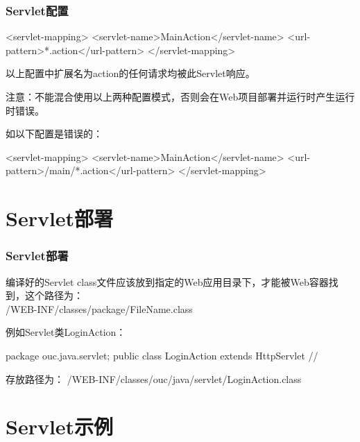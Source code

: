 \begin{frame}[fragile] %
\frametitle{Servlet配置}

\begin{xmlCode}
<servlet-mapping>
  <servlet-name>MainAction</servlet-name>
  <url-pattern>*.action</url-pattern>
</servlet-mapping>
\end{xmlCode}

以上配置中扩展名为action的任何请求均被此Servlet响应。

{\Red\kai 注意：不能混合使用以上两种配置模式，否则会在Web项目部署并运行时产生运行时错误。}

如以下配置是错误的：

\begin{xmlCode}
<servlet-mapping>
  <servlet-name>MainAction</servlet-name>
  <url-pattern>/main/*.action</url-pattern>
</servlet-mapping>
\end{xmlCode}
\end{frame}

\section{Servlet部署}

\begin{frame}[fragile] %
\frametitle{Servlet部署}

编译好的Servlet class文件应该放到指定的Web应用目录下，才能被Web容器找到，这个路径为：\\
{\Red /WEB-INF/classes/package/FileName.class}

例如Servlet类LoginAction：
\begin{javaCode}
package ouc.java.servlet;
public class LoginAction extends HttpServlet {
  //     
}
\end{javaCode}

存放路径为：{\Blue
  /WEB-INF/classes/ouc/java/servlet/LoginAction.class}
\end{frame}

\section{Servlet示例} 

